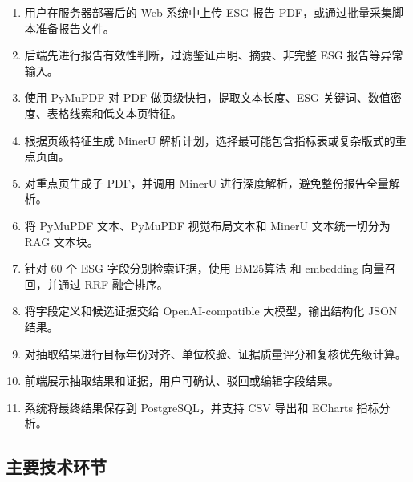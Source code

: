 \documentclass[UTF8,a4paper,12pt]{ctexart}
\begin{document}
\begin{enumerate}
  \item 用户在服务器部署后的 Web 系统中上传 ESG 报告 PDF，或通过批量采集脚本准备报告文件。
  \item 后端先进行报告有效性判断，过滤鉴证声明、摘要、非完整 ESG 报告等异常输入。
  \item 使用 PyMuPDF 对 PDF 做页级快扫，提取文本长度、ESG 关键词、数值密度、表格线索和低文本页特征。
  \item 根据页级特征生成 MinerU 解析计划，选择最可能包含指标表或复杂版式的重点页面。
  \item 对重点页生成子 PDF，并调用 MinerU 进行深度解析，避免整份报告全量解析。
  \item 将 PyMuPDF 文本、PyMuPDF 视觉布局文本和 MinerU 文本统一切分为 RAG 文本块。
  \item 针对 60 个 ESG 字段分别检索证据，使用 BM25算法 和 embedding 向量召回，并通过 RRF 融合排序。
  \item 将字段定义和候选证据交给 OpenAI-compatible 大模型，输出结构化 JSON 结果。
  \item 对抽取结果进行目标年份对齐、单位校验、证据质量评分和复核优先级计算。
  \item 前端展示抽取结果和证据，用户可确认、驳回或编辑字段结果。
  \item 系统将最终结果保存到 PostgreSQL，并支持 CSV 导出和 ECharts 指标分析。
\end{enumerate}

\subsection{主要技术环节}
\end{document}
